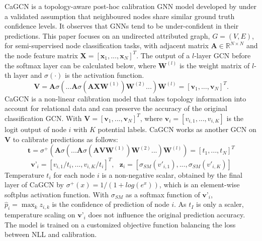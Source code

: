 CaGCN is a topology-aware post-hoc calibration GNN model developed by \cite{wang2021confident} under a validated assumption that neighboured nodes share similar ground truth confidence levels. It observes that GNNs tend to be under-confident in their predictions. This paper focuses on an undirected attributed graph, $G=(V, E)$, for semi-supervised node classification tasks, with adjacent matrix $\textbf{A}\in \mathbb{R}^{N\times N}$ and the node feature matrix $\textbf{X} =[\textbf{x}_1,...,\textbf{x}_N]^T$. The output of a $l$-layer GCN before the softmax layer can be calculated below, where $\textbf{W}^{(l)}$ is the weight matrix of $l$-th layer and $\sigma(\cdot)$ is the activation function.
\begin{equation}
    \textbf{V} = \textbf{A}\sigma(...\textbf{A}\sigma(\textbf{A}\textbf{X}\textbf{W}^{(1)})\textbf{W}^{(2)}...)\textbf{W}^{(l)} = [\textbf{v}_1,..., \textbf{v}_N]^T.
\end{equation}
 CaGCN is a non-linear calibration model that takes topology information into account for relational data and can preserve the accuracy of the original classification GCN. With $\textbf{V}=[\textbf{v}_1,...,\textbf{v}_N]^T$, where $\textbf{v}_i=[v_{i,1},...,v_{i,K}]$ is the logit output of node $i$ with $K$ potential labels. CaGCN works as another GCN on $\textbf{V}$ to calibrate predictions as follows:
 \begin{equation}
     \textbf{t}=\sigma^{+}(\textbf{A}\sigma(...\textbf{A}\sigma(\textbf{A}\textbf{V}\textbf{W}^{(1)})\textbf{W}^{(2)}...)\textbf{W}^{(l)})=[t_1,...,t_N]^T
 \end{equation}
 \begin{equation}
     \textbf{v'}_i=[v_{i,1}/t_i,...,v_{i,K}/t_i]^T, \text{ }\textbf{z}_i=[\sigma_{SM}(v'_{i,1}),...,\sigma_{SM}(v'_{i,K})]
 \end{equation}
 Temperature $t_i$ for each node $i$ is a non-negative scalar, obtained by the final layer of CaGCN by $\sigma^{+}(x)=1/(1+log(e^x))$, which is an element-wise softplus activation function. With $\sigma_{SM}$ as a softmax function of $\textbf{v'}_i$, $\hat{p}_i=\max_k z_{i,k}$ is the confidence of prediction of node $i$. As $t_I$ is only a scaler, temperature scaling on $\textbf{v'}_i$ does not influence the original prediction accuracy. The model is trained on a customized objective function balancing the loss between NLL and calibration.

